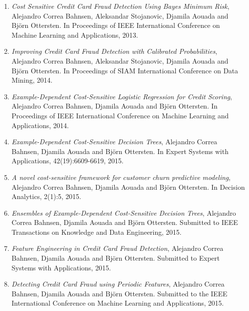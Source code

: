 \begin{enumerate}
\item \citep{CorreaBahnsen2013} \textit{Cost Sensitive Credit Card Fraud Detection Using Bayes 
Minimum Risk}, Alejandro Correa Bahnsen,  Aleksandar Stojanovic, Djamila Aouada and Bj\"orn 
Ottersten. In Proceedings of IEEE International Conference on Machine Learning and Applications, 
2013.

\item \citep{CorreaBahnsen2014} \textit{Improving Credit Card Fraud Detection with Calibrated 
Probabilities}, Alejandro Correa Bahnsen, Aleksandar Stojanovic, Djamila Aouada and Bj\"orn 
Ottersten. In Proceedings of SIAM International Conference on Data Mining, 2014.

\item \citep{CorreaBahnsen2014b} \textit{Example-Dependent Cost-Sensitive Logistic Regression for 
Credit Scoring}, Alejandro Correa Bahnsen, Djamila Aouada and Bj\"orn Ottersten.
In Proceedings of IEEE International Conference on Machine Learning and Applications, 2014.

\item \citep{CorreaBahnsen2015} \textit{Example-Dependent Cost-Sensitive Decision Trees},
Alejandro Correa Bahnsen, Djamila Aouada and Bj\"orn Ottersten.
In Expert Systems with Applications, 42(19):6609-6619, 2015.

\item \citep{CorreaBahnsen2015a} \textit{A novel cost-sensitive framework for customer churn 
predictive modeling}, Alejandro Correa Bahnsen, Djamila Aouada and Bj\"orn Ottersten.
In Decision Analytics, 2(1):5, 2015.

\item \citep{CorreaBahnsen2015b} \textit{Ensembles of Example-Dependent Cost-Sensitive Decision 
Trees}, Alejandro Correa Bahnsen, Djamila Aouada and Bj\"orn Ottersten.
Submitted to IEEE Transactions on Knowledge and Data Engineering, 2015.

\item \citep{CorreaBahnsen2015c} \textit{Feature Engineering in Credit Card Fraud Detection},
Alejandro Correa Bahnsen, Djamila Aouada and Bj\"orn Ottersten. Submitted to Expert Systems with 
Applications, 2015.

\item \citep{CorreaBahnsen2015d} \textit{Detecting Credit Card Fraud using Periodic Features}, 
Alejandro Correa Bahnsen, Djamila Aouada and Bj\"orn Ottersten.
Submitted to the IEEE International Conference on Machine Learning and Applications, 2015.


\end{enumerate}

